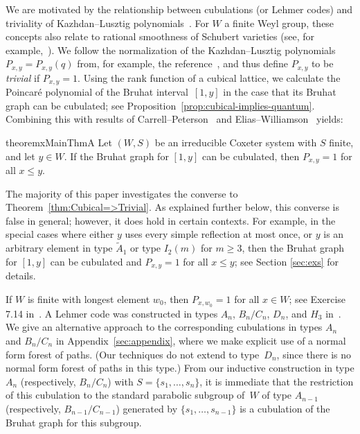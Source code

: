 \documentclass[11pt]{amsart}
\theoremstyle{plain}
\newtheorem{thm}{Theorem}[section]
\theoremstyle{definition}
\newcommand{\Pxy}{P_{x,y}} %
\numberwithin{equation}{subsection}
\begin{document}
We are motivated by the relationship between cubulations (or Lehmer codes) and triviality of Kazhdan--Lusztig polynomials~\cite{KL1}. For $W$ a finite Weyl group, these concepts also relate to rational smoothness of Schubert varieties (see, for example,~\cite{Bolognini2025,SentinelliZatti,GaetzGao}). We follow the normalization of the Kazhdan--Lusztig polynomials $\Pxy = \Pxy(q)$ from, for example, the reference~\cite{BjoernerBrenti}, and thus define $\Pxy$ to be \emph{trivial} if $\Pxy = 1$. Using the rank function of a cubical lattice, we calculate the Poincar\'e polynomial of the Bruhat interval~$[1,y]$ in the case that its Bruhat graph can be cubulated; see Proposition~\ref{prop:cubical-implies-quantum}. Combining this with results of Carrell--Peterson~\cite{Carrell} and Elias--Williamson~\cite{EliasWilliamson} yields:

\begin{restatable*}{theoremx}{MainThmA}%
\label{thm:Cubical=>Trivial}
  Let $(W,S)$ be an irreducible Coxeter system with $S$ finite, and let $y \in W$. If the Bruhat graph for $[1,y]$ can be cubulated, then $\Pxy = 1$ for all $x \leq y$.
\end{restatable*}

The majority of this paper investigates the converse to Theorem~\ref{thm:Cubical=>Trivial}. As explained further below, this converse is false in general; however, it does hold in certain contexts.  For example, in the special cases where either $y$ uses every simple reflection at most once, or $y$ is an arbitrary element in type $\tilde{A}_1$ or type $I_2(m)$ for $m \geq 3$, then the Bruhat graph for $[1,y]$ can be cubulated and $P_{x,y} = 1$ for all $x \leq y$; see Section \ref{sec:exs} for details. 

If $W$ is finite with longest element $w_0$, then $P_{x,w_0} = 1$ for all $x \in W$; see Exercise 7.14 in~\cite{Humphreys}. A Lehmer code was constructed in types $A_n$, $B_n/C_n$, $D_n$, and $H_3$  in~\cite[Sections 5.2--5.3]{Bolognini2025}. We give an alternative approach to the corresponding cubulations in types $A_n$ and $B_n/C_n$ in Appendix~\ref{sec:appendix}, where we make explicit use of a normal form forest of paths. (Our techniques do not extend to type~$D_n$, since there is no normal form forest of paths in this type.) From our inductive construction in type $A_n$ (respectively, $B_n/C_n$) with $S = \{ s_1, \dots, s_n\}$, it is immediate that the restriction of this cubulation to the standard parabolic subgroup of~$W$ of type $A_{n-1}$ (respectively, $B_{n-1}/C_{n-1}$) generated by $\{s_1, \dots, s_{n-1} \}$ is a cubulation of the Bruhat graph for this subgroup.
\end{document}
